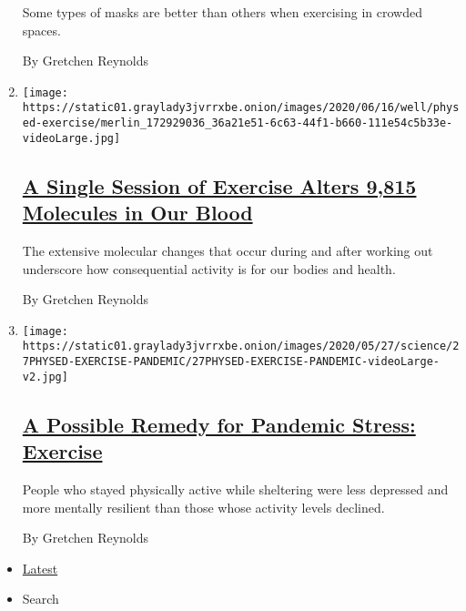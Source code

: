 \begin{enumerate}
  Some types of masks are better than others when exercising in crowded
  spaces.

  By Gretchen Reynolds
\item
  \texttt{[image: https://static01.graylady3jvrrxbe.onion/images/2020/06/16/well/physed-exercise/merlin\_172929036\_36a21e51-6c63-44f1-b660-111e54c5b33e-videoLarge.jpg]}

  \hypertarget{a-single-session-of-exercise-alters-9815-molecules-in-our-blood}{%
  \subsection{\texorpdfstring{\href{/2020/06/10/well/move/a-single-session-of-exercise-alters-9815-molecules-in-our-blood.html}{A
  Single Session of Exercise Alters 9,815 Molecules in Our
  Blood}}{A Single Session of Exercise Alters 9,815 Molecules in Our Blood}}\label{a-single-session-of-exercise-alters-9815-molecules-in-our-blood}}

  The extensive molecular changes that occur during and after working
  out underscore how consequential activity is for our bodies and
  health.

  By Gretchen Reynolds
\item
  \texttt{[image: https://static01.graylady3jvrrxbe.onion/images/2020/05/27/science/27PHYSED-EXERCISE-PANDEMIC/27PHYSED-EXERCISE-PANDEMIC-videoLarge-v2.jpg]}

  \hypertarget{a-possible-remedy-for-pandemic-stress-exercise}{%
  \subsection{\texorpdfstring{\href{/2020/05/27/well/move/coronavirus-exercise-stress-mental-health-depression-mood-resilience.html}{A
  Possible Remedy for Pandemic Stress:
  Exercise}}{A Possible Remedy for Pandemic Stress: Exercise}}\label{a-possible-remedy-for-pandemic-stress-exercise}}

  People who stayed physically active while sheltering were less
  depressed and more mentally resilient than those whose activity levels
  declined.

  By Gretchen Reynolds
\end{enumerate}

\begin{itemize}
\tightlist
\item
  \protect\hyperlink{stream-panel}{Latest}
\item
  Search
\end{itemize}


